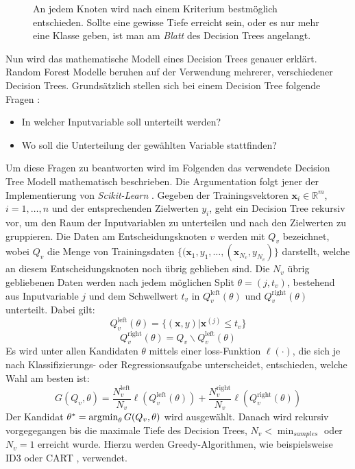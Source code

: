 \begin{figure}[ht]
	\label{fig:rf1}
	\begin{center}
		\begin{tiny}
		\end{tiny}
	\end{center}
	\caption[Schematische Darstellung eines Decision Tree Modells]
	{An jedem Knoten wird nach einem Kriterium bestm\"oglich entschieden. Sollte eine gewisse Tiefe erreicht sein,
		oder es nur mehr eine Klasse geben, ist man am \textit{Blatt} des Decision Trees angelangt.}
\end{figure}

Nun wird das mathematische Modell eines Decision Trees genauer erkl\"art. Random Forest Modelle beruhen auf der Verwendung mehrerer, verschiedener Decision Trees.
Grunds\"atzlich stellen sich bei einem Decision Tree folgende Fragen \cite[Seiten 251 bis 253]{shalev}:
\begin{itemize}
	\item In welcher Inputvariable soll unterteilt werden?
	\item Wo soll die Unterteilung der gew\"ahlten Variable stattfinden?
\end{itemize}

Um diese Fragen zu beantworten wird im Folgenden das verwendete Decision Tree Modell mathematisch beschrieben. Die Argumentation folgt jener der Implementierung von \textit{Scikit-Learn} \cite{sklearn}.
Gegeben der Trainingsvektoren $\mathbf{x}_i \in \mathbb{R}^m$, $i=1,\dots ,n$ und der entsprechenden Zielwerten $y_i$, geht ein Decision Tree rekursiv vor, um den
Raum der Inputvariablen zu unterteilen und nach den Zielwerten zu gruppieren. Die Daten am Entscheidungsknoten $v$ werden mit
$Q_v$ bezeichnet, wobei $Q_v$ die Menge von Trainingsdaten $\{(\mathbf{x}_1, y_1, \dots , (\mathbf{x}_{N_v}, y_{N_v})\}$ darstellt, welche an diesem
Entscheidungsknoten noch \"ubrig geblieben sind. Die $N_v$ \"ubrig
gebliebenen Daten werden nach jedem m\"oglichen
Split $\theta = (j, t_v)$, bestehend aus Inputvariable $j$ und dem Schwellwert $t_v$ in $Q_v^{\text{left}}(\theta)$ und $Q_v^{\text{right}}(\theta)$ unterteilt. Dabei gilt:
$$ Q_v^{\text{left}}(\theta) = \{ (\mathbf{x},y) | \mathbf{x}^{(j)} \leq t_v \} $$
$$ Q_v^{\text{right}}(\theta) = Q_v \backslash Q_v^{\text{left}}(\theta) $$
Es wird unter allen Kandidaten $\theta$ mittels einer loss-Funktion $\ell(\cdot)$, die sich je nach Klassifizierungs- oder Regressionsaufgabe unterscheidet, entschieden,
welche Wahl am besten ist:
$$ G(Q_v, \theta) = \frac{N_v^{\text{left}}}{N_v}\ell(Q_v^{\text{left}}(\theta)) + \frac{N_v^{\text{right}}}{N_v}\ell(Q_v^{\text{right}}(\theta)) $$
Der Kandidat $\theta^* = \operatorname*{argmin}_{\theta}G(Q_v, \theta)$ wird ausgew\"ahlt. Danach wird rekursiv vorgegegangen bis die maximale Tiefe des Decision Trees,
$N_v < \operatorname{min}_{samples}$ oder $N_v = 1$ erreicht wurde. Hierzu werden Greedy-Algorithmen, wie beispielsweise ID3 \cite{ID3} oder CART \cite{breiman1984classification}, verwendet.

